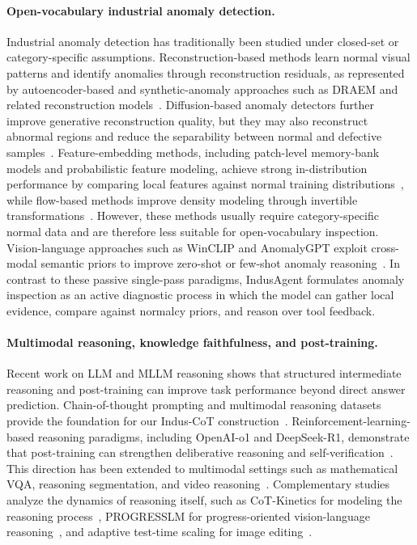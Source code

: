 \documentclass{llmxive}
\begin{document}
{\paragraph{Open-vocabulary industrial anomaly detection.}
Industrial anomaly detection has traditionally been studied under closed-set or category-specific assumptions. Reconstruction-based methods learn normal visual patterns and identify anomalies through reconstruction residuals, as represented by autoencoder-based and synthetic-anomaly approaches such as DRAEM and related reconstruction models~\citep{zavrtanik2021draem, bergmann2018improving}. Diffusion-based anomaly detectors further improve generative reconstruction quality, but they may also reconstruct abnormal regions and reduce the separability between normal and defective samples~\citep{wyatt2022anoddpm, mu2023diffusionad}. Feature-embedding methods, including patch-level memory-bank models and probabilistic feature modeling, achieve strong in-distribution performance by comparing local features against normal training distributions~\citep{roth2022patchcore, defard2021padim}, while flow-based methods improve density modeling through invertible transformations~\citep{yu2021fastflow, rudolph2022csflow}. However, these methods usually require category-specific normal data and are therefore less suitable for open-vocabulary inspection. Vision-language approaches such as WinCLIP and AnomalyGPT exploit cross-modal semantic priors to improve zero-shot or few-shot anomaly reasoning~\citep{jeong2023winclip, gu2024anomalygpt}. In contrast to these passive single-pass paradigms, IndusAgent formulates anomaly inspection as an active diagnostic process in which the model can gather local evidence, compare against normalcy priors, and reason over tool feedback.

\paragraph{Multimodal reasoning, knowledge faithfulness, and post-training.}
Recent work on LLM and MLLM reasoning shows that structured intermediate reasoning and post-training can improve task performance beyond direct answer prediction. Chain-of-thought prompting and multimodal reasoning datasets provide the foundation for our Indus-CoT construction~\citep{wei2022chain, zhang2023multimodal}. Reinforcement-learning-based reasoning paradigms, including OpenAI-o1 and DeepSeek-R1, demonstrate that post-training can strengthen deliberative reasoning and self-verification~\citep{jaech2024openaio1, deepseekr1}. This direction has been extended to multimodal settings such as mathematical VQA, reasoning segmentation, and video reasoning~\citep{peng2025lmmr1, liu2025seg, feng2025videor1}. Complementary studies analyze the dynamics of reasoning itself, such as CoT-Kinetics for modeling the reasoning process~\citep{Bi2025CoTKineticsAT}, PROGRESSLM for progress-oriented vision-language reasoning~\citep{zhang2026progresslm}, and adaptive test-time scaling for image editing~\citep{ADE_CoT}. 

}
\end{document}
